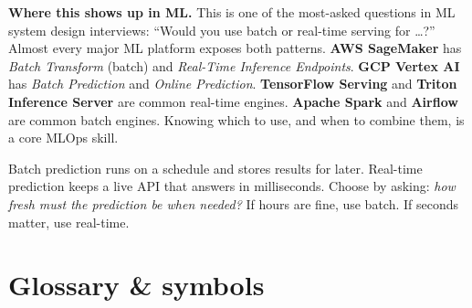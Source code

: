 \documentclass[a4paper,11pt]{article}
\begin{document}
\noindent\textbf{Where this shows up in ML.}
This is one of the most-asked questions in ML system design interviews:
``Would you use batch or real-time serving for \ldots?''
Almost every major ML platform exposes both patterns. \textbf{AWS SageMaker}
has \emph{Batch Transform} (batch) and \emph{Real-Time Inference Endpoints}.
\textbf{GCP Vertex AI} has \emph{Batch Prediction} and \emph{Online Prediction}.
\textbf{TensorFlow Serving} and \textbf{Triton Inference Server} are common
real-time engines. \textbf{Apache Spark} and \textbf{Airflow} are common batch
engines. Knowing which to use, and when to combine them, is a core MLOps skill.

\begin{keytake}
Batch prediction runs on a schedule and stores results for later.
Real-time prediction keeps a live API that answers in milliseconds.
Choose by asking: \emph{how fresh must the prediction be when needed?}
If hours are fine, use batch. If seconds matter, use real-time.
\end{keytake}

\section*{Glossary \& symbols}
\end{document}
